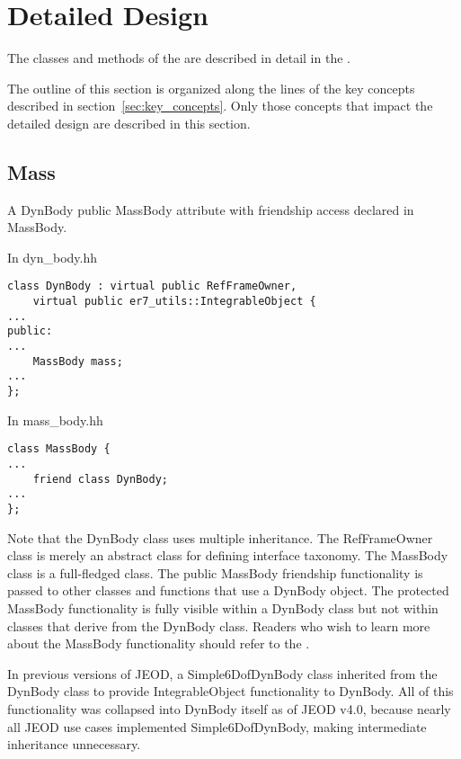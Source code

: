 \section{Detailed Design}

The classes and methods of the \ModelDesc are described in detail in the
.

The outline of this section is organized along the lines of the
key concepts described in section~\ref{sec:key_concepts}.
Only those concepts that impact the detailed design are described in
this section.


\subsection{Mass}

A DynBody \hasa public MassBody attribute with friendship access 
declared in MassBody.

In dyn\_body.hh
\begin{verbatim}
class DynBody : virtual public RefFrameOwner,
    virtual public er7_utils::IntegrableObject { 
...
public:
...
    MassBody mass;
...
};
\end{verbatim}

In mass\_body.hh
\begin{verbatim}
class MassBody {
...
    friend class DynBody;
...
};
\end{verbatim}

Note that the DynBody class uses multiple inheritance. The RefFrameOwner class 
is merely an abstract class for defining interface taxonomy. The MassBody 
class is a full-fledged class.
The public MassBody friendship 
functionality is passed to other classes and functions that use a
DynBody object. The protected MassBody functionality is fully visible
within a DynBody class but not within classes that derive from the DynBody 
class. Readers who wish to learn more about the MassBody
functionality should refer to the .

In previous versions of JEOD, a Simple6DofDynBody class inherited from the 
DynBody class to provide IntegrableObject functionality to DynBody. All of 
this functionality was collapsed into DynBody itself as of JEOD v4.0, because 
nearly all JEOD use cases implemented Simple6DofDynBody, making intermediate 
inheritance unnecessary.


